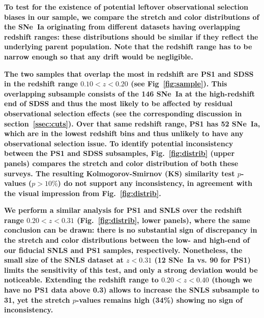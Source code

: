 \documentclass[]{aa}
\begin{document}
\textbf{To test for the existence of potential leftover observational selection
    biases in our sample, we compare the stretch and color distributions of the
    SNe~Ia originating from different datasets having overlapping redshift
    ranges: these distributions should be similar if they reflect the underlying
    parent population. Note that the redshift range has to be narrow enough so
that any drift would be negligible.}

\textbf{The two samples that overlap the most in redshift are PS1 and SDSS in
    the redshift range $0.10 < z < 0.20$ (see Fig~\ref{fig:sample}). This
    overlapping subsample consists of the 146 SNe~Ia at the high-redshift end of
    SDSS and thus the most likely to be affected by residual observational
    selection effects (see the corresponding discussion in
    section~\ref{ssec:cuts}). Over that same redshift range, PS1 has 52 SNe~Ia,
    which are in the lowest redshift bins and thus unlikely to have any
    observational selection issue. To identify potential inconsistency between
    the PS1 and SDSS subsamples, Fig.~\ref{fig:distrib} (upper panels) compares
    the stretch and color distribution of both these surveys. The resulting
Kolmogorov-Smirnov (KS) similarity test $p$-values ($p >10\%$) do not support
any inconsistency, in agreement with the visual impression from
Fig.~\ref{fig:distrib}.}

\textbf{We perform a similar analysis for PS1 and SNLS over the redshift range
    $0.20 < z < 0.31$ (Fig.~\ref{fig:distrib}, lower panels), where the same
    conclusion can be drawn: there is no substantial sign of discrepancy in the
    stretch and color distributions between the low- and high-end of our
    fiducial SNLS and PS1 samples, respectively. Nonetheless, the small size of
    the SNLS dataset at $z < 0.31$ (12 SNe~Ia vs. 90 for PS1) limits the
    sensitivity of this test, and only a strong deviation would be noticeable.
Extending the redshift range to $0.20 < z < 0.40$ (though we have no PS1 data
above 0.3) allows to increase the SNLS subsample to 31, yet the stretch
$p$-values remains high (34\%) showing no sign of inconsistency.}
\end{document}

